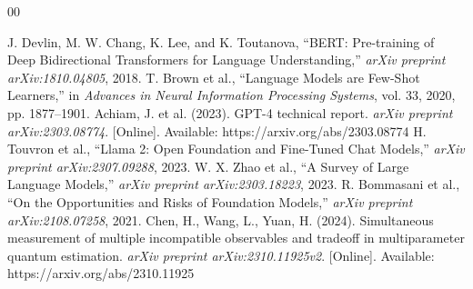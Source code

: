 \documentclass[conference]{IEEEtran}
\begin{document}
\begin{thebibliography}{00}

 J. Devlin, M. W. Chang, K. Lee, and K. Toutanova, ``BERT: Pre-training of Deep Bidirectional Transformers for Language Understanding,'' \emph{arXiv preprint arXiv:1810.04805}, 2018.
 T. Brown et al., ``Language Models are Few-Shot Learners,'' in \emph{Advances in Neural Information Processing Systems}, vol. 33, 2020, pp. 1877--1901.
 Achiam, J. et al. (2023). GPT-4 technical report. \emph{arXiv preprint arXiv:2303.08774}. [Online]. Available: https://arxiv.org/abs/2303.08774
 H. Touvron et al., ``Llama 2: Open Foundation and Fine-Tuned Chat Models,'' \emph{arXiv preprint arXiv:2307.09288}, 2023.
 W. X. Zhao et al., ``A Survey of Large Language Models,'' \emph{arXiv preprint arXiv:2303.18223}, 2023.
 R. Bommasani et al., ``On the Opportunities and Risks of Foundation Models,'' \emph{arXiv preprint arXiv:2108.07258}, 2021.
 Chen, H., Wang, L., Yuan, H. (2024). Simultaneous measurement of multiple incompatible observables and tradeoff in multiparameter quantum estimation. \emph{arXiv preprint arXiv:2310.11925v2}. [Online]. Available: https://arxiv.org/abs/2310.11925
\end{thebibliography}

\vspace{12pt}
\end{document}
